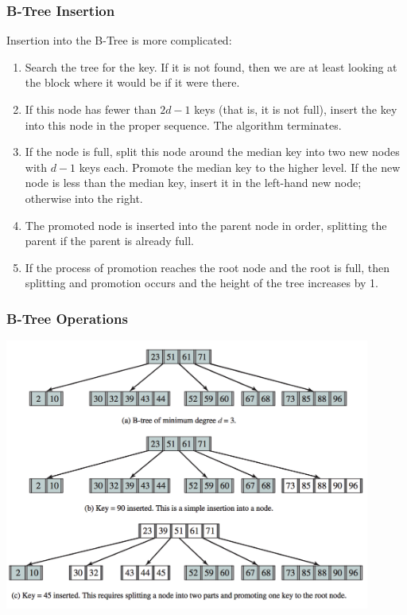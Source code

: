 \begin{frame}
\frametitle{B-Tree Insertion}

Insertion into the B-Tree is more complicated:

\begin{enumerate}
	\item Search the tree for the key. If it is not found, then we are at least looking at the block where it would be if it were there.
	\item If this node has fewer than $2d-1$ keys (that is, it is not full), insert the key into this node in the proper sequence. The algorithm terminates.
	\item If the node is full, split this node around the median key into two new nodes with $d-1$ keys each. Promote the median key to the higher level. If the new node is less than the median key, insert it in the left-hand new node; otherwise into the right.
	\item The promoted node is inserted into the parent node in order, splitting the parent if the parent is already full.
	\item If the process of promotion reaches the root node and the root is full, then splitting and promotion occurs and the height of the tree increases by 1.
\end{enumerate}


\end{frame}



\begin{frame}
\frametitle{B-Tree Operations}


\begin{center}
	\includegraphics[width=0.9\textwidth]{images/b-tree-insert-top.png}
\end{center}


\end{frame}

